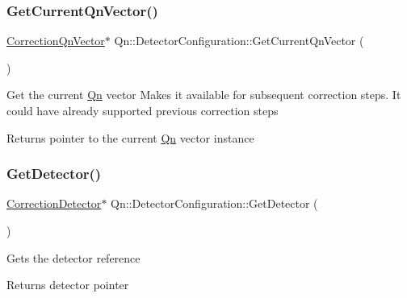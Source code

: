 \subsubsection{\texorpdfstring{Get\+Current\+Qn\+Vector()}{GetCurrentQnVector()}}
{\footnotesize\ttfamily \mbox{\hyperlink{classQn_1_1CorrectionQnVector}{Correction\+Qn\+Vector}}$\ast$ Qn\+::\+Detector\+Configuration\+::\+Get\+Current\+Qn\+Vector (\begin{DoxyParamCaption}{ }\end{DoxyParamCaption})\hspace{0.3cm}{\ttfamily [inline]}}

Get the current \mbox{\hyperlink{namespaceQn}{Qn}} vector Makes it available for subsequent correction steps. It could have already supported previous correction steps \begin{DoxyReturn}{Returns}
pointer to the current \mbox{\hyperlink{namespaceQn}{Qn}} vector instance 
\end{DoxyReturn}
\mbox{\label{classQn_1_1DetectorConfiguration_a2a34cbc491d83fd5073bc4e9bb0d4943}} 
\subsubsection{\texorpdfstring{Get\+Detector()}{GetDetector()}}
{\footnotesize\ttfamily \mbox{\hyperlink{classQn_1_1CorrectionDetector}{Correction\+Detector}}$\ast$ Qn\+::\+Detector\+Configuration\+::\+Get\+Detector (\begin{DoxyParamCaption}{ }\end{DoxyParamCaption})\hspace{0.3cm}{\ttfamily [inline]}}

Gets the detector reference

\begin{DoxyReturn}{Returns}
detector pointer 
\end{DoxyReturn}
\mbox{\label{classQn_1_1DetectorConfiguration_a77df91021253bf6e5320bfe52b7147d7}} 
